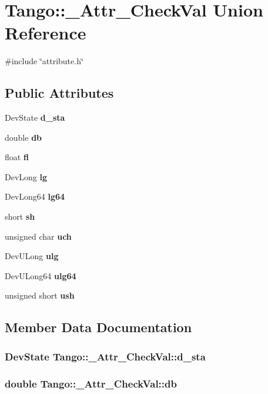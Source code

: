 \section{Tango\-:\-:\-\_\-\-Attr\-\_\-\-Check\-Val Union Reference}
\label{unionTango_1_1__Attr__CheckVal}


{\ttfamily \#include \char`\"{}attribute.\-h\char`\"{}}

\subsection*{Public Attributes}
\begin{DoxyCompactItemize}
\item 
Dev\-State {\bf d\-\_\-sta}
\item 
double {\bf db}
\item 
float {\bf fl}
\item 
Dev\-Long {\bf lg}
\item 
Dev\-Long64 {\bf lg64}
\item 
short {\bf sh}
\item 
unsigned char {\bf uch}
\item 
Dev\-U\-Long {\bf ulg}
\item 
Dev\-U\-Long64 {\bf ulg64}
\item 
unsigned short {\bf ush}
\end{DoxyCompactItemize}


\subsection{Member Data Documentation}
\subsubsection[{d\-\_\-sta}]{\setlength{\rightskip}{0pt plus 5cm}Dev\-State Tango\-::\-\_\-\-Attr\-\_\-\-Check\-Val\-::d\-\_\-sta}\label{unionTango_1_1__Attr__CheckVal_afed10fbfee093e96573c4ac0869a1ea9}
\subsubsection[{db}]{\setlength{\rightskip}{0pt plus 5cm}double Tango\-::\-\_\-\-Attr\-\_\-\-Check\-Val\-::db}\label{unionTango_1_1__Attr__CheckVal_ad4e0d2ca80dc7bf6d188fa25085dcb7c}
